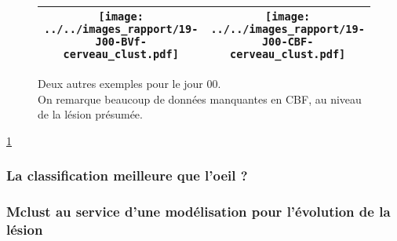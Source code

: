 \begin{figure}[!p]
\begin{center}
\begin{tabular}{|c|c|}
\hline
\texttt{[image: ../../images\_rapport/19-J00-BVf-cerveau\_clust.pdf]}
&
\texttt{[image: ../../images\_rapport/19-J00-CBF-cerveau\_clust.pdf]}
\\
\hline
\end{tabular}
\end{center}
\caption{Deux autres exemples pour le jour 00.%
\\%
On remarque beaucoup de donn\'ees manquantes en CBF, au niveau de la l\'esion pr\'esum\'ee.%
}
\label{19_CBF-BVf_3d00}
\end{figure}

\etoile
\ref{19_CBF-BVf_3d00}

\subsubsection{La classification meilleure que l'oeil ?}








\subsubsection{Mclust au service d'une mod\'elisation pour l'\'evolution de la l\'esion}

